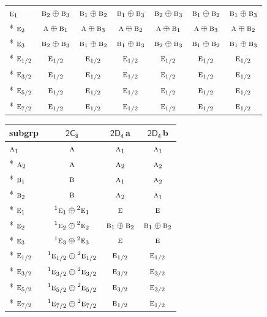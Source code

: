 \documentclass[10pt,a4paper]{article}
\numberwithin{equation}{section}
\newcommand{\grp}[1]{\mathsf{#1}}
\newcommand{\irr}[1]{\text{\normalfont\scshape #1}}
\newcommand{\conjpair}[1]{{}^{#1}}
\newcommand{\clsletter}[1]{\,{\scriptsize\color{black!55}#1}}
\begin{document}
{\begin{longtable}{@{}lcccccc@{}}
$\irr{e}_{1}$ & $\irr{b}_{2}\oplus \irr{b}_{3}$ & $\irr{b}_{1}\oplus \irr{b}_{2}$ & $\irr{b}_{1}\oplus \irr{b}_{3}$ & $\irr{b}_{2}\oplus \irr{b}_{3}$ & $\irr{b}_{1}\oplus \irr{b}_{2}$ & $\irr{b}_{1}\oplus \irr{b}_{3}$\\*
$\irr{e}_{2}$ & $\irr{a}\oplus \irr{b}_{1}$ & $\irr{a}\oplus \irr{b}_{3}$ & $\irr{a}\oplus \irr{b}_{2}$ & $\irr{a}\oplus \irr{b}_{1}$ & $\irr{a}\oplus \irr{b}_{3}$ & $\irr{a}\oplus \irr{b}_{2}$\\*
$\irr{e}_{3}$ & $\irr{b}_{2}\oplus \irr{b}_{3}$ & $\irr{b}_{1}\oplus \irr{b}_{2}$ & $\irr{b}_{1}\oplus \irr{b}_{3}$ & $\irr{b}_{2}\oplus \irr{b}_{3}$ & $\irr{b}_{1}\oplus \irr{b}_{2}$ & $\irr{b}_{1}\oplus \irr{b}_{3}$\\*
$\irr{e}_{1/2}$ & $\irr{e}_{1/2}$ & $\irr{e}_{1/2}$ & $\irr{e}_{1/2}$ & $\irr{e}_{1/2}$ & $\irr{e}_{1/2}$ & $\irr{e}_{1/2}$\\*
$\irr{e}_{3/2}$ & $\irr{e}_{1/2}$ & $\irr{e}_{1/2}$ & $\irr{e}_{1/2}$ & $\irr{e}_{1/2}$ & $\irr{e}_{1/2}$ & $\irr{e}_{1/2}$\\*
$\irr{e}_{5/2}$ & $\irr{e}_{1/2}$ & $\irr{e}_{1/2}$ & $\irr{e}_{1/2}$ & $\irr{e}_{1/2}$ & $\irr{e}_{1/2}$ & $\irr{e}_{1/2}$\\*
$\irr{e}_{7/2}$ & $\irr{e}_{1/2}$ & $\irr{e}_{1/2}$ & $\irr{e}_{1/2}$ & $\irr{e}_{1/2}$ & $\irr{e}_{1/2}$ & $\irr{e}_{1/2}$\\
\bottomrule\end{longtable}}
{\small\begin{longtable}{@{}lccc@{}}\toprule
subgrp & \href{2C8.pdf}{$\grp{2C_{8}}$} & \href{2D4.pdf}{$\grp{2D_{4}}$}\clsletter{a} & \href{2D4.pdf}{$\grp{2D_{4}}$}\clsletter{b}\\\midrule\endhead
\bottomrule\endfoot\endlastfoot
$\irr{a}_{1}$ & $\irr{a}$ & $\irr{a}_{1}$ & $\irr{a}_{1}$\\*
$\irr{a}_{2}$ & $\irr{a}$ & $\irr{a}_{2}$ & $\irr{a}_{2}$\\*
$\irr{b}_{1}$ & $\irr{b}$ & $\irr{a}_{1}$ & $\irr{a}_{2}$\\*
$\irr{b}_{2}$ & $\irr{b}$ & $\irr{a}_{2}$ & $\irr{a}_{1}$\\*
$\irr{e}_{1}$ & $\conjpair{1}\irr{e}_{1}\oplus \conjpair{2}\irr{e}_{1}$ & $\irr{e}$ & $\irr{e}$\\*
$\irr{e}_{2}$ & $\conjpair{1}\irr{e}_{2}\oplus \conjpair{2}\irr{e}_{2}$ & $\irr{b}_{1}\oplus \irr{b}_{2}$ & $\irr{b}_{1}\oplus \irr{b}_{2}$\\*
$\irr{e}_{3}$ & $\conjpair{1}\irr{e}_{3}\oplus \conjpair{2}\irr{e}_{3}$ & $\irr{e}$ & $\irr{e}$\\*
$\irr{e}_{1/2}$ & $\conjpair{1}\irr{e}_{1/2}\oplus \conjpair{2}\irr{e}_{1/2}$ & $\irr{e}_{1/2}$ & $\irr{e}_{1/2}$\\*
$\irr{e}_{3/2}$ & $\conjpair{1}\irr{e}_{3/2}\oplus \conjpair{2}\irr{e}_{3/2}$ & $\irr{e}_{3/2}$ & $\irr{e}_{3/2}$\\*
$\irr{e}_{5/2}$ & $\conjpair{1}\irr{e}_{5/2}\oplus \conjpair{2}\irr{e}_{5/2}$ & $\irr{e}_{3/2}$ & $\irr{e}_{3/2}$\\*
$\irr{e}_{7/2}$ & $\conjpair{1}\irr{e}_{7/2}\oplus \conjpair{2}\irr{e}_{7/2}$ & $\irr{e}_{1/2}$ & $\irr{e}_{1/2}$\\
\bottomrule\end{longtable}}
\end{document}

